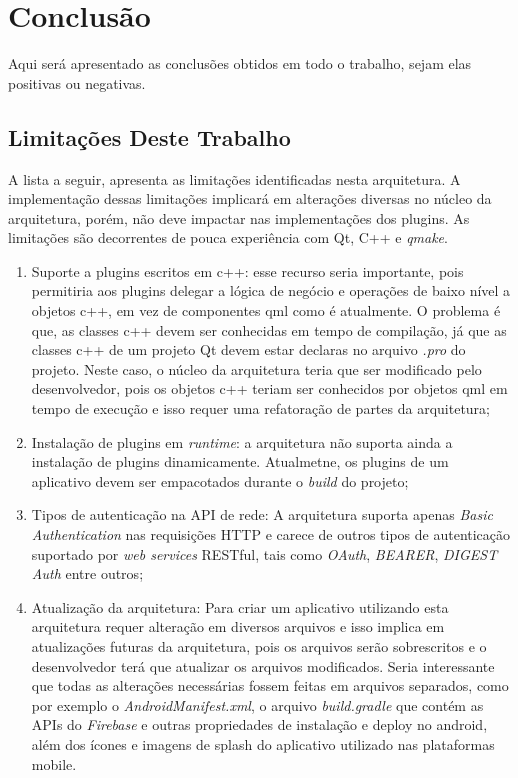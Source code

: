 \section{Conclusão}\label{sec:conclusao}
Aqui será apresentado as conclusões obtidos em todo o trabalho, sejam elas positivas ou negativas.


\subsection{Limitações Deste Trabalho}
A lista a seguir, apresenta as limitações identificadas nesta arquitetura. A implementação dessas limitações implicará em alterações diversas no núcleo da arquitetura, porém, não deve impactar nas implementações dos plugins. As limitações são decorrentes de pouca experiência com Qt, C++ e \textit{qmake}.

\begin{enumerate}
	\item Suporte a plugins escritos em c++: esse recurso seria importante, pois permitiria aos plugins delegar a lógica de negócio e operações de baixo nível a objetos c++, em vez de componentes qml como é atualmente. O problema é que, as classes c++ devem ser conhecidas em tempo de compilação, já que as classes c++ de um projeto Qt devem estar declaras no arquivo \textit{.pro} do projeto. Neste caso, o núcleo da arquitetura teria que ser modificado pelo desenvolvedor, pois os objetos c++ teriam ser conhecidos por objetos qml em tempo de execução e isso requer uma refatoração de partes da arquitetura;

	\item Instalação de plugins em \textit{runtime}: a arquitetura não suporta ainda a instalação de plugins dinamicamente. Atualmetne, os plugins de um aplicativo devem ser empacotados durante o \textit{build} do projeto;

	\item Tipos de autenticação na API de rede: A arquitetura suporta apenas \textit{Basic Authentication} nas requisições HTTP e carece de outros tipos de autenticação suportado por \textit{web services} RESTful, tais como \textit{OAuth}, \textit{BEARER}, \textit{DIGEST Auth} entre outros;

	\item Atualização da arquitetura: Para criar um aplicativo utilizando esta arquitetura requer alteração em diversos arquivos e isso implica em atualizações futuras da arquitetura, pois os arquivos serão sobrescritos e o desenvolvedor terá que atualizar os arquivos modificados. Seria interessante que todas as alterações necessárias fossem feitas em arquivos separados, como por exemplo o \textit{AndroidManifest.xml}, o arquivo \textit{build.gradle} que contém as APIs do \textit{Firebase} e outras propriedades de instalação e deploy no android, além dos ícones e imagens de splash do aplicativo utilizado nas plataformas mobile.
\end{enumerate}



